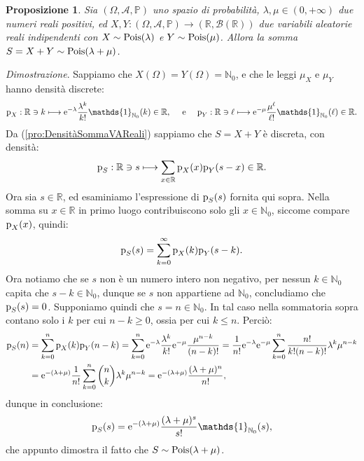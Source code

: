 \documentclass[11pt]{book}
\makeatletter
\theoremstyle{Definizione}
\theoremstyle{TeoremaProposizioneLemmaCorollario}
\newtheorem{mypropo}[myteo]{Proposizione}
\theoremstyle{OsservazioneNota}
\renewenvironment{proof}[1][\proofname]{\par
  \normalfont \topsep6\p@\@plus6\p@\relax
  \trivlist
  \item[\hskip\labelsep
        \itshape
    #1\@addpunct{.}]\ignorespaces
}{%
  \endtrivlist\@endpefalse
}
\newcommand{\R}{\mathbb{R}}
\newcommand{\N}{\mathbb{N}}
\renewcommand{\P}{\mathbb{P}}
\newcommand{\p}{\textup{p}}
\newcommand{\e}{\textup{e}}
\newcommand{\uno}[1]{\mathds{1}_{#1}}
\renewenvironment{proof}{\textsl{Dimostrazione}.}{}
\makeatother
\begin{document}
\begin{boxpro}
\begin{mypropo}
Sia $(\Omega,\mathcal{A},\P)$ uno spazio di probabilità, $\lambda,\mu \in (0,+\infty)$ due numeri reali positivi, ed $X,Y:(\Omega,\mathcal{A},\P) \longrightarrow (\R,\mathcal{B}(\R))$ due variabili aleatorie reali indipendenti con $X \sim \textup{Pois}(\lambda)$ e $Y \sim \textup{Pois}(\mu)$. Allora la somma $S = X+Y \sim \textup{Pois}(\lambda+\mu)$.
\end{mypropo}
\tcblower
\begin{proof}
Sappiamo che $X(\Omega) = Y(\Omega) = \N_0$, e che le leggi $\mu_X$ e $\mu_Y$ hanno densità discrete:
$$
\p_X:\R \ni k \longmapsto \e^{-\lambda} \frac{\lambda^k}{k!}\uno{\N_0}(k) \in \R,\quad \textup{ e }\quad \p_Y:\R\ni \ell \longmapsto \e^{-\mu} \frac{\mu^{\ell}}{\ell!}\uno{\N_0}(\ell)\in \R.
$$
Da (\ref{pro:DensitàSommaVAReali}) sappiamo che $S = X+Y$ è discreta, con densità:
$$
\p_S: \R \ni s \longmapsto \sum_{x\in \R} \p_X(x)\p_Y(s-x)\in \R.
$$
Ora sia $s\in \R$, ed esaminiamo l'espressione di $\p_S(s)$ fornita qui sopra. Nella somma su $x\in \R$ in primo luogo contribuiscono solo gli $x\in \N_0$, siccome compare $\p_X(x)$, quindi:
$$
\p_S(s) = \sum_{k = 0}^\infty \p_X(k)\p_Y(s-k).
$$
Ora notiamo che se $s$ non è un numero intero non negativo, per nessun $k\in \N_0$ capita che $s-k\in \N_0$, dunque se $s$ non appartiene ad $\N_0$, concludiamo che $\p_S(s) = 0$. Supponiamo quindi che $s = n\in \N_0$. In tal caso nella sommatoria sopra contano solo i $k$ per cui $n-k \geq 0$, ossia per cui $k\leq n$. Perciò:
\begin{align*}
\p_S(n) &= \sum_{k = 0}^n \p_X(k) \p_Y(n-k) = \sum_{k = 0}^n \e^{-\lambda} \frac{\lambda^k}{k!} \e^{-\mu} \frac{\mu^{n-k}}{(n-k)!} = \frac{1}{n!} \e^{-\lambda}\e^{-\mu} \sum_{k = 0}^n \frac{n!}{k!(n-k)!}\lambda^k \mu^{n-k} \\
&= \e^{-(\lambda+\mu)} \frac{1}{n!}\sum_{k = 0}^n \binom{n}{k}\lambda^k\mu^{n-k} = \e^{-(\lambda+\mu)}\frac{(\lambda+\mu)^n}{n!},
\end{align*}
dunque in conclusione:
$$
\p_S(s) = \e^{-(\lambda+\mu)} \frac{(\lambda+\mu)^s}{s!}\uno{\N_0}(s),
$$
che appunto dimostra il fatto che $S \sim \textup{Pois}(\lambda+\mu)$.
\end{proof}
\end{boxpro}
\end{document}

